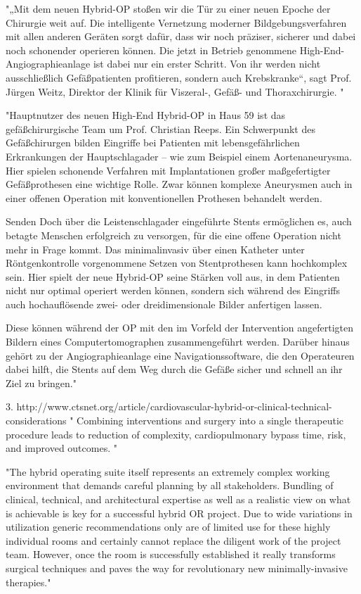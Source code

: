 	"„Mit dem neuen Hybrid-OP stoßen wir die Tür zu einer neuen Epoche der Chirurgie weit auf. Die intelligente Vernetzung moderner Bildgebungsverfahren mit allen anderen Geräten sorgt dafür, dass wir noch präziser, sicherer und dabei noch schonender operieren können. Die jetzt in Betrieb genommene High-End-Angiographieanlage ist dabei nur ein erster Schritt. Von ihr werden nicht ausschließlich Gefäßpatienten profitieren, sondern auch Krebskranke“, sagt Prof. Jürgen Weitz, Direktor der Klinik für Viszeral-, Gefäß- und Thoraxchirurgie. "
	
	"Hauptnutzer des neuen High-End Hybrid-OP in Haus 59 ist das gefäßchirurgische Team um Prof. Christian Reeps. Ein Schwerpunkt des Gefäßchirurgen bilden Eingriffe bei Patienten mit lebensgefährlichen Erkrankungen der Hauptschlagader – wie zum Beispiel einem Aortenaneurysma. Hier spielen schonende Verfahren mit Implantationen großer maßgefertigter Gefäßprothesen eine wichtige Rolle. Zwar können komplexe Aneurysmen auch in einer offenen Operation mit konventionellen Prothesen behandelt werden.
	
	Senden	
	Doch über die Leistenschlagader eingeführte Stents ermöglichen es, auch betagte Menschen erfolgreich zu versorgen, für die eine offene Operation nicht mehr in Frage kommt. Das minimalinvasiv über einen Katheter unter Röntgenkontrolle vorgenommene Setzen von Stentprothesen kann hochkomplex sein. Hier spielt der neue Hybrid-OP seine Stärken voll aus, in dem Patienten nicht nur optimal operiert werden können, sondern sich während des Eingriffs auch hochauflösende zwei- oder dreidimensionale Bilder anfertigen lassen.
	
	Diese können während der OP mit den im Vorfeld der Intervention angefertigten Bildern eines Computertomographen zusammengeführt werden. Darüber hinaus gehört zu der Angiographieanlage eine Navigationssoftware, die den Operateuren dabei hilft, die Stents auf dem Weg durch die Gefäße sicher und schnell an ihr Ziel zu bringen."

3. http://www.ctsnet.org/article/cardiovascular-hybrid-or-clinical-technical-considerations	
	" Combining interventions and surgery into a single therapeutic procedure leads to reduction of complexity, cardiopulmonary bypass time, risk, and improved outcomes. "
	
	"The hybrid operating suite itself represents an extremely complex working environment that demands careful planning by all stakeholders. Bundling of clinical, technical, and architectural expertise as well as a realistic view on what is achievable is key for a successful hybrid OR project. Due to wide variations in utilization generic recommendations only are of limited use for these highly individual rooms and certainly cannot replace the diligent work of the project team. However, once the room is successfully established it really transforms surgical techniques and paves the way for revolutionary new minimally-invasive therapies."

